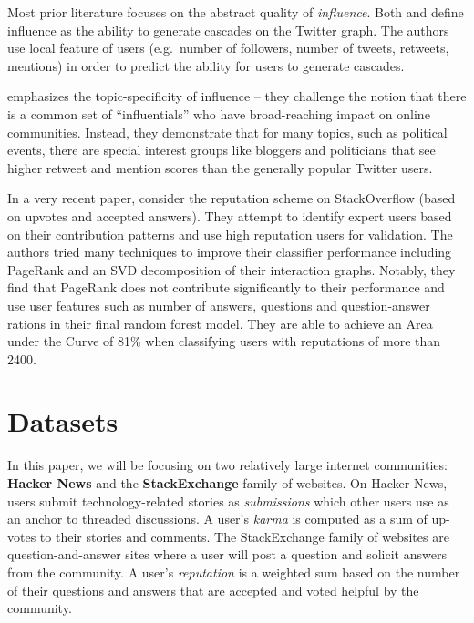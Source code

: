 \documentclass[11pt]{article}
\begin{document}
Most prior literature focuses on the abstract quality of \textit{influence}.
Both \citet{bakshy2011everyone} and \citet{cha2010measuring} define influence as
the ability to generate cascades on the Twitter graph. The authors use local
feature of users (e.g.\ number of followers, number of tweets, retweets,
mentions) in order to predict the ability for users to generate cascades.

\citet{cha2010measuring} emphasizes the topic-specificity of influence -- they
challenge the notion that there is a common set of ``influentials'' who have
broad-reaching impact on online communities. Instead, they demonstrate that for
many topics, such as political events, there are special interest groups like
bloggers and politicians that see higher retweet and mention scores than the
generally popular Twitter users.

In a very recent paper, \citet{movshovitzanalysis} consider the reputation
scheme on StackOverflow (based on upvotes and accepted answers). They attempt to
identify expert users based on their contribution patterns and use high
reputation users for validation. The authors tried many techniques to improve
their classifier performance including PageRank and an SVD decomposition of
their interaction graphs. Notably, they find that PageRank does not contribute
significantly to their performance and use user features such as number of
answers, questions and question-answer rations in their final random forest
model. They are able to achieve an Area under the Curve of 81\% when classifying
users with reputations of more than 2400.

\section{Datasets}

In this paper, we will be focusing on two relatively large internet communities:
\textbf{Hacker News} and the \textbf{StackExchange} family of websites. On
Hacker News, users submit technology-related stories as \textit{submissions}
which other users use as an anchor to threaded discussions.  A user's
\textit{karma} is computed as a sum of up-votes to their stories and comments.
The StackExchange family of websites are question-and-answer sites where a user
will post a question and solicit answers from the community. A user's
\textit{reputation} is a weighted sum based on the number of their questions and
answers that are accepted and voted helpful by the community.
\end{document}
